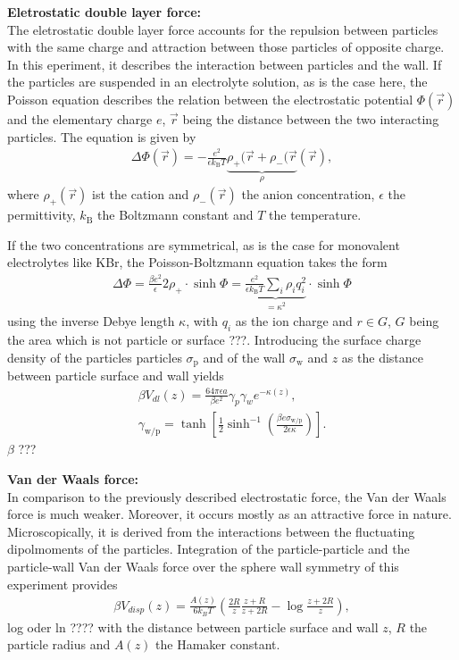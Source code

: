 \documentclass[.../bericht]{subfilies}
\begin{document}
        \textbf{Eletrostatic double layer force:}\\
        The eletrostatic double layer force accounts for the repulsion between particles with the same charge and attraction between those particles of opposite charge. In this eperiment, it describes the interaction between particles and the wall. If the particles are suspended in an electrolyte solution, as is the case here, the Poisson equation describes the relation between the electrostatic potential $\Phi (\vec{r})$ and the elementary charge $e$, $\vec{r}$ being the distance between the two interacting particles. The equation is given by
        \begin{align*}
          \Delta \Phi (\vec{r})=-\frac{e^2}{\epsilon k_\mathrm{B} T}\underbrace{\rho_+(\vec{r}+\rho_-(\vec{r}}_{\rho}(\vec{r}),
        \end{align*}
        where $\rho_+(\vec{r})$ ist the cation and $\rho_-(\vec{r})$ the anion concentration, $\epsilon$ the permittivity, $k_\mathrm{B}$ the Boltzmann constant and $T$ the temperature.

        If the two concentrations are symmetrical, as is the case for monovalent electrolytes like KBr, the Poisson-Boltzmann equation takes the form
        \begin{align*}
          \Delta \Phi= \frac{\beta e^2}{\epsilon}2\rho_+ \cdot\sinh\Phi= \underbrace{\frac{e^2}{\epsilon k_\mathrm{B} T}\sum_i \rho_i q_i^2}_{=\kappa^2} \cdot \sinh\Phi
        \end{align*}
        using the inverse Debye length $\kappa$, with $q_i$ as the ion charge and $r\in G$, $G$ being the area which is not particle or surface ???. Introducing the surface charge density of the particles particles $\sigma_\mathrm{p}$ and of the wall $\sigma_\mathrm{w}$ and $z$ as the distance between particle surface and wall yields
        \begin{align*}
          \beta V_{dl}(z)=\frac{64\pi \epsilon a}{\beta e^2} \gamma_p \gamma_w e^{-\kappa(z)}, \\
          \gamma_\mathrm{w/p}=\tanh \left[ \frac{1}{2}\sinh^{-1}  \left( \frac{\beta e \sigma_\mathrm{w/p}}{2\epsilon \kappa } \right) \right].
        \end{align*}
        $\beta$ ???
        \medskip

        \textbf{Van der Waals force:}\\
        In comparison to the previously described electrostatic force, the Van der Waals force is much weaker. Moreover, it occurs mostly as an attractive force in nature. Microscopically, it is derived from the interactions between the fluctuating dipolmoments of the particles. Integration of the particle-particle and the particle-wall Van der Waals force over the sphere wall symmetry of this experiment provides
        \begin{align}
          \beta V_{disp}(z)=\frac{A(z)}{6k_B T}(\frac{2R}{z}\frac{z+R}{z+2R}-\log\frac{z+2R}{z}),
        \end{align}
        log oder ln ????
        with the distance between particle surface and wall $z$, $R$ the particle radius and $A(z)$ the Hamaker constant.
        \medskip
\end{document}
